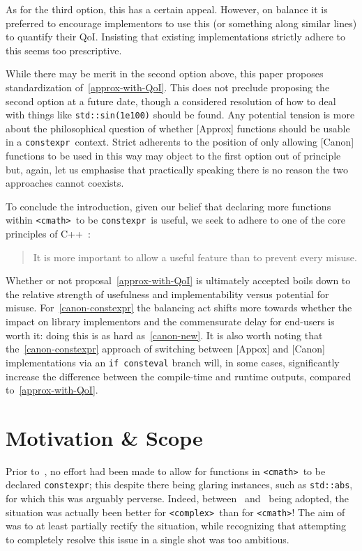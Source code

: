\documentclass[prd,twocolumn,amsmath,amssymb,nofootinbib,eqsecnum]{revtex4-1}
\newcommand{\constexpr}{\code{constexpr}\xspace}
\newcommand{\code}[1]{{\tt #1}}
\newcommand{\header}[1]{{\tt <#1>}}
\newcommand{\cmath}{\header{cmath}}
\newcommand{\complex}{\header{complex}}
\begin{document}
As for the third option, this has a certain appeal. However, on balance it is preferred to encourage implementors to use this (or something along similar lines) to quantify their QoI. Insisting that existing implementations strictly adhere to this seems too prescriptive.

While there may be merit in the second option above, this paper proposes standardization of~\ref{approx-with-QoI}. This does not preclude proposing the second option at a future date, though a considered resolution of how to deal with things like \code{std::sin(1e100)} should be found. 
Any potential tension is more about the philosophical question of whether [Approx] functions should be usable in a \constexpr\ context. Strict adherents to the position of only allowing [Canon] functions to be used in this way may object to the first option out of principle but, again, let us emphasise that practically speaking there is no reason the two approaches cannot coexists.

To conclude the introduction, given our belief that declaring more functions within \cmath\ to be \constexpr\ is useful, we seek to adhere to one of the core principles of C++~\cite{DandE}:
\begin{quote}
	It is more important to allow a useful feature than to prevent every misuse.
\end{quote}
Whether or not proposal~\ref{approx-with-QoI} is ultimately accepted boils down to the relative strength of usefulness and implementability versus potential for misuse. For~\ref{canon-constexpr} the balancing act shifts more towards whether the impact on library implementors and the commensurate delay for end-users is worth it: doing this is as hard as~\ref{canon-new}. It is also worth noting that the~\ref{canon-constexpr} approach of  switching between [Appox] and [Canon] implementations via an \code{if consteval} branch will, in some cases, significantly increase the difference between the compile-time and runtime outputs, compared to~\ref{approx-with-QoI}.

\section{Motivation \& Scope}
\label{sec:Motivation}

Prior to~\cite{Rosten-constexpr}, no effort had been made to allow for functions in \cmath\ to be declared \constexpr; this despite there being glaring instances, such as \code{std::abs}, for which this was arguably perverse. Indeed, between~\cite{AP-complex} and~\cite{Rosten-constexpr} being adopted, the situation was actually been better for \complex\ than for \cmath! The aim of~\cite{Rosten-constexpr} was to at least partially rectify the situation, while recognizing that attempting to completely resolve this issue in a single shot was too ambitious.
\end{document}
